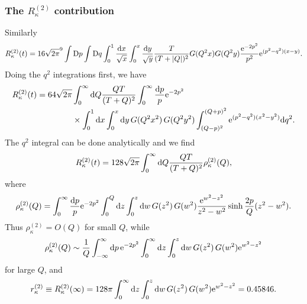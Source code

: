 \documentclass[preprint]{ptephy_v1}%
\newcommand{\rme}{{\rm e}}
\newcommand{\rmd}{{\rm d}}
\newcommand{\rmD}{{\rm D}}
\begin{document}
\subsubsection{The $R_\kappa^{(2)}$ contribution}
Similarly
\begin{equation}
R^{(2)}_\kappa(t)=16\sqrt{2\pi}^9\int \rmD p\int \rmD q\int_0^1
\frac{\rmd x}{\sqrt{x}}\int_0^x\frac{\rmd y}{\sqrt{y}}
\frac{T}{(T+|Q|)^2}G(Q^2x)G(Q^2y)
\frac{\rme^{-2p^2}}{p^2}
\rme^{(p^2-q^2)(x-y)}. 
\end{equation}
Doing the $q^2$ integrations first, we have
\begin{equation}
\begin{split}
R^{(2)}_\kappa(t)=64\sqrt{2\pi}&\int_0^\infty\rmd Q \frac{QT}{(T+Q)^2}
\int_0^\infty\frac{\rmd p}{p}\rme^{-2p^2}\\
&\times \int_0^1\rmd x\int_0^x\rmd y \, G(Q^2x^2) \, G(Q^2y^2)
\int_{(Q-p)^2}^{(Q+p)^2} \rme^{(p^2-q^2)(x^2-y^2)}\rmd q^2.
\end{split}
\end{equation}
The $q^2$ integral can be done analytically and we find
\begin{equation}
R^{(2)}_\kappa(t)=128\sqrt{2\pi}\int_0^\infty\rmd Q \frac{QT}{(T+Q)^2}
\rho^{(2)}_\kappa(Q),
\end{equation}
where
\begin{equation}
\rho^{(2)}_\kappa(Q)=
\int_0^\infty\frac{\rmd p}{p}\rme^{-2p^2}
\int_0^Q\rmd z\int_0^z\rmd w \, G(z^2) \, G(w^2)
\frac{\rme^{w^2-z^2}}{z^2-w^2}\sinh\frac{2p}{Q}(z^2-w^2).
\end{equation}
Thus  $\rho_\kappa^{(2)} = O(Q)$ for small $Q$, while
\begin{equation}
\rho^{(2)}_\kappa(Q)\sim\frac{1}{Q}
\int_{-\infty}^\infty\rmd p\, \rme^{-2p^2}
\int_0^\infty\rmd z\int_0^z\rmd w \, G(z^2) \, G(w^2)
\rme^{w^2-z^2}
\end{equation}
for large $Q$, and
\begin{equation}
r^{(2)}_\kappa \equiv R_\kappa^{(2)}(\infty) =
128\pi
\int_0^\infty\rmd z\int_0^z\rmd w \, G(z^2)\, G(w^2)
\rme^{w^2-z^2}=0.45846.
\end{equation}
\end{document}
